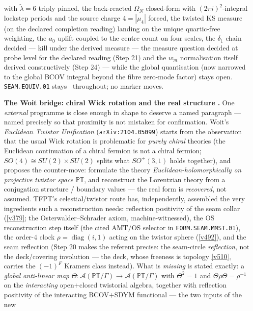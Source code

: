 with $\tilde\lambda=6$ triply pinned, the back-reacted $\Omega_N$ closed-form with
$(2\pi i)^2$-integral lockstep periods and the source charge $4=|\mu_4|$ forced, the twisted KS
measure (on the declared completion reading) landing on the unique quartic-free weighting, the
$a_0$ uplift coupled to the centre count on four scales, the $\delta_1$ chain decided ---
kill under the derived measure --- the measure question decided at probe level for the
declared reading (Step 21) and the $w_m$ normalisation itself derived constructively
(Step 24) --- while the
global quantisation (now narrowed to the global BCOV integral beyond the fibre zero-mode
factor) stays open.
\texttt{SEAM.EQUIV.01}
stays \mO\ throughout; no marker moves.

\par\medskip\noindent\textbf{The Woit bridge: chiral Wick rotation and the real structure \mO.}
One \emph{external} programme is close enough in shape to deserve a named paragraph --- named
precisely so that proximity is not mistaken for confirmation. Woit's \emph{Euclidean Twistor
Unification} (\texttt{arXiv:2104.05099}) starts from the observation that the usual Wick rotation is
problematic for \emph{purely chiral} theories (the Euclidean continuation of a chiral fermion is not
a chiral fermion; $SO(4)\cong SU(2){\times}SU(2)$ splits what $SO^+(3,1)$ holds together), and
proposes the counter-move: formulate the theory \emph{Euclidean-holomorphically on projective twistor
space} $\mathbb{PT}$, and reconstruct the Lorentzian theory from a conjugation structure / boundary
values --- the real form is \emph{recovered}, not assumed. TFPT's celestial/twistor route has,
independently, assembled the very ingredients such a reconstruction needs: reflection positivity of
the seam collar (\vref{v379}; the Osterwalder--Schrader axiom, machine-witnessed), the OS
reconstruction step itself (the cited AMT/OS selector in \texttt{FORM.SEAM.MMST.01}), the order-$4$
clock $\rho=\operatorname{diag}(i,1)$ acting on the twistor sphere (\vref{v492}), and the seam
reflection (Step 20 makes the referent precise: the seam-circle \emph{reflection}, not the
deck/covering involution --- the deck, whose freeness is topology \vref{v510}, carries the
$(-1)^F$ Kramers class instead).
What is \emph{missing} is stated exactly: a \emph{global anti-linear map}
$\Theta:\mathcal A(\mathbb{PT}/\Gamma)\to\mathcal A(\mathbb{PT}/\Gamma)$ with $\Theta^2=1$ and
$\Theta\rho\Theta=\rho^{-1}$ on the \emph{interacting} open$+$closed twistorial algebra, together
with reflection positivity of the interacting BCOV$+$SDYM functional --- the two inputs of the new
